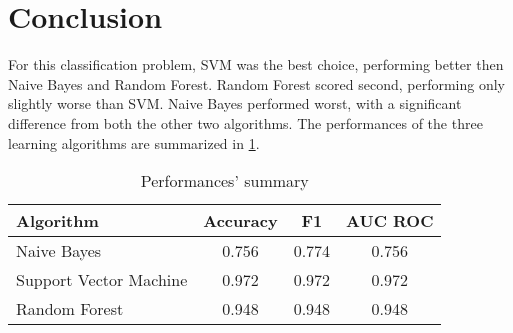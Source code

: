 \section{Conclusion}
\label{sec:conclusion}

For this classification problem, \ac{SVM} was the best choice, performing better then Naive Bayes and Random Forest.
Random Forest scored second, performing only slightly worse than \ac{SVM}.
Naive Bayes performed worst, with a significant difference from both the other two algorithms.
The performances of the three learning algorithms are summarized in \cref{tab:summary}.

\begin{table}
	\centering
	\caption{Performances' summary}
	\label{tab:summary}
	\begin{tabular}{lccc}
		\toprule
			\multicolumn{1}{l}{Algorithm} &
			\multicolumn{1}{c}{Accuracy} &
			\multicolumn{1}{c}{F1} &
			\multicolumn{1}{c}{AUC ROC} \\
		\midrule
			Naive Bayes            & 0.756 & 0.774 & 0.756 \\
			Support Vector Machine & 0.972 & 0.972 & 0.972 \\
			Random Forest          & 0.948 & 0.948 & 0.948 \\
		\bottomrule
	\end{tabular}
\end{table}
